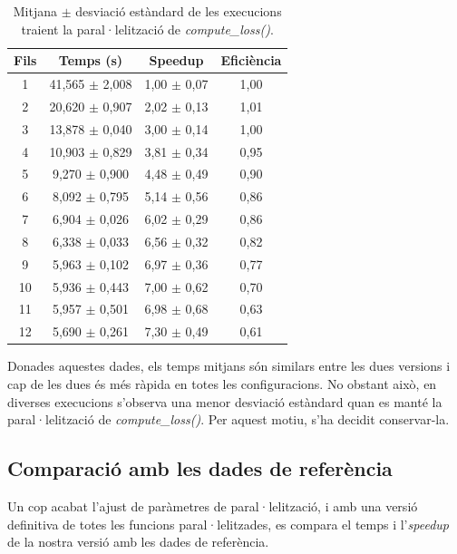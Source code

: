 \documentclass{article}
\begin{document}
\begin{table}[H]
\centering
\begin{tabular}{|c|c|c|c|}
\hline
\textbf{Fils} & \textbf{Temps (s)} & \textbf{Speedup} & \textbf{Eficiència} \\ \hline
1 & 41,565 $\pm$ 2,008 & 1,00 $\pm$ 0,07 & 1,00 \\ \hline
2 & 20,620 $\pm$ 0,907 & 2,02 $\pm$ 0,13 & 1,01 \\ \hline
3 & 13,878 $\pm$ 0,040 & 3,00 $\pm$ 0,14 & 1,00 \\ \hline
4 & 10,903 $\pm$ 0,829 & 3,81 $\pm$ 0,34 & 0,95 \\ \hline
5 & 9,270 $\pm$ 0,900 & 4,48 $\pm$ 0,49 & 0,90 \\ \hline
6 & 8,092 $\pm$ 0,795 & 5,14 $\pm$ 0,56 & 0,86 \\ \hline
7 & 6,904 $\pm$ 0,026 & 6,02 $\pm$ 0,29 & 0,86 \\ \hline
8 & 6,338 $\pm$ 0,033 & 6,56 $\pm$ 0,32 & 0,82 \\ \hline
9 & 5,963 $\pm$ 0,102 & 6,97 $\pm$ 0,36 & 0,77 \\ \hline
10 & 5,936 $\pm$ 0,443 & 7,00 $\pm$ 0,62 & 0,70 \\ \hline
11 & 5,957 $\pm$ 0,501 & 6,98 $\pm$ 0,68 & 0,63 \\ \hline
12 & 5,690 $\pm$ 0,261 & 7,30 $\pm$ 0,49 & 0,61 \\ \hline
\end{tabular}
\caption{Mitjana $\pm$ desviació estàndard de les execucions traient la paral·lelització de \textit{compute\_loss()}.}
\label{tab:resultats9}
\end{table}

Donades aquestes dades, els temps mitjans són similars entre les dues versions i cap de les dues és més ràpida en totes les configuracions. No obstant això, en diverses execucions s'observa una menor desviació estàndard quan es manté la paral·lelització de \textit{compute\_loss()}. Per aquest motiu, s'ha decidit conservar-la.

\subsection{Comparació amb les dades de referència}

Un cop acabat l'ajust de paràmetres de paral·lelització, i amb una versió definitiva de totes les funcions paral·lelitzades, es compara el temps i l'\textit{speedup} de la nostra versió amb les dades de referència.
\end{document}
